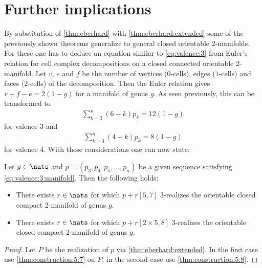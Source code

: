 \section{Further implications}

By substitution of \autoref{thm:eberhard} with \autoref{thm:eberhard:extended} some of the previously shown theorems generalize to general closed orientable 2-manifolds. For these one has to deduce an equation similar to  \autoref{eq:valence:3} from Euler's relation for cell complex decompositions on a closed connected orientable $2$-manifold. Let $v$, $e$ and $f$ be the number of vertices ($0$-cells), edges ($1$-cells) and faces ($2$-cells) of the decomposition. Then the Euler relation gives $v + f - e = 2(1-g)$ for a manifold of genus $g$. As seen previously, this can be transformed to
\begin{align}
  \sum_{k=3}^n \left(6 - k \right) p_k = 12(1-g) \label{eq:valence:3:manifold}
\end{align}
for valence $3$ and
\begin{align}
  \sum_{k=3}^n \left(4 - k \right) p_k = 8(1-g)  \label{eq:valence:4:manifold}
\end{align}
for valence $4$. With these considerations one can now state:
\begin{theorem}
  Let $g \in \nats$ and $p = (p_3, p_4, p_5, \dots, p_n)$ be a given sequence satisfying \autoref{eq:valence:3:manifold}. Then the following holds:
  \begin{itemize}
  \item There exists $r \in \nats$ for which $p + r [5, 7]$ $3$-realizes the orientable closed compact 2-manifold of genus $g$.
  \item There exists $r \in \nats$ for which $p + r [2 \times 5, 8]$ $3$-realizes the orientable closed compact 2-manifold of genus $g$.
  \end{itemize}
  \begin{proof}
    Let $P$ be the realization of $p$ via \autoref{thm:eberhard:extended}. In the first case use \autoref{thm:construction:5:7} on $P$, in the second case use \autoref{thm:construction:5:8}.
  \end{proof}
\end{theorem}

